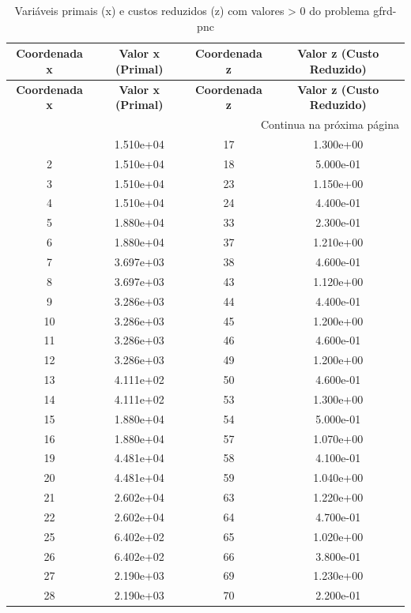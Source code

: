 \documentclass[12pt]{article}
\begin{document}
\begin{longtable}{@{}cccc@{}}
\caption{Variáveis primais (x) e custos reduzidos (z) com valores > 0 do problema gfrd-pnc} \\
\toprule
\textbf{Coordenada x} & \textbf{Valor x (Primal)} & \textbf{Coordenada z} & \textbf{Valor z (Custo Reduzido)} \\
\midrule
\endfirsthead

\toprule
\textbf{Coordenada x} & \textbf{Valor x (Primal)} & \textbf{Coordenada z} & \textbf{Valor z (Custo Reduzido)} \\
\midrule
\endhead

\midrule \multicolumn{4}{r}{{Continua na próxima página}} \\ \midrule
\endfoot

\bottomrule
\endlastfoot
1 & 1.510e+04 & 17 & 1.300e+00 \\
2 & 1.510e+04 & 18 & 5.000e-01 \\
3 & 1.510e+04 & 23 & 1.150e+00 \\
4 & 1.510e+04 & 24 & 4.400e-01 \\
5 & 1.880e+04 & 33 & 2.300e-01 \\
6 & 1.880e+04 & 37 & 1.210e+00 \\
7 & 3.697e+03 & 38 & 4.600e-01 \\
8 & 3.697e+03 & 43 & 1.120e+00 \\
9 & 3.286e+03 & 44 & 4.400e-01 \\
10 & 3.286e+03 & 45 & 1.200e+00 \\
11 & 3.286e+03 & 46 & 4.600e-01 \\
12 & 3.286e+03 & 49 & 1.200e+00 \\
13 & 4.111e+02 & 50 & 4.600e-01 \\
14 & 4.111e+02 & 53 & 1.300e+00 \\
15 & 1.880e+04 & 54 & 5.000e-01 \\
16 & 1.880e+04 & 57 & 1.070e+00 \\
19 & 4.481e+04 & 58 & 4.100e-01 \\
20 & 4.481e+04 & 59 & 1.040e+00 \\
21 & 2.602e+04 & 63 & 1.220e+00 \\
22 & 2.602e+04 & 64 & 4.700e-01 \\
25 & 6.402e+02 & 65 & 1.020e+00 \\
26 & 6.402e+02 & 66 & 3.800e-01 \\
27 & 2.190e+03 & 69 & 1.230e+00 \\
28 & 2.190e+03 & 70 & 2.200e-01 \\

\end{longtable}
\end{document}
